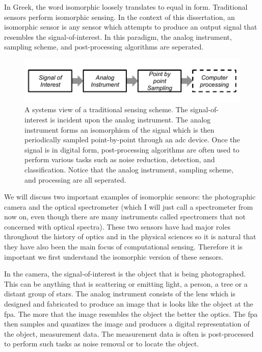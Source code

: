 In Greek, the word isomorphic loosely translates to equal in form. Traditional sensors perform isomorphic sensing. In the context of this dissertation, an isomorphic sensor is any sensor which attempts to produce an output signal that resembles the signal-of-interest. In this paradigm, the analog instrument, sampling scheme, and post-processing algorithms are seperated.

\begin{figure}
    \centering
    \includegraphics[scale=1]{isomorphicsensorflowchart}
    \caption{A systems view of a traditional sensing scheme. The signal-of-interest is incident upon the analog instrument. The analog instrument forms an isomorphism of the signal which is then periodically sampled point-by-point through an \gls{adc} device. Once the signal is in digital form, post-processing algorithms are often used to perform various tasks such as noise reduction, detection, and classification. Notice that the analog instrument, sampling scheme, and processing are all seperated. }
    \label{fig:isomorphicsesingflowchart}
\end{figure}

We will discuss two important examples of isomorphic sensors: the photographic camera and the optical spectrometer (which I will just call a spectrometer from now on, even though there are many instruments called spectromers that not concerned with optical spectra). These two sensors have had major roles throughout the history of optics and in the physical sciences so it is natural that they have also been the main focus of computational sensing. Therefore it is important we first understand the isomorphic version of these sensors.

In the camera, the signal-of-interest is the object that is being photographed. This can be anything that is scattering or emitting light, a person, a tree or a distant group of stars. The analog instrument consists of the lens which is designed and fabricated to produce an image that is looks like the object at the \gls{fpa}. The more that the image resembles the object the better the optics. The \gls{fpa} then samples and quantizes the image and produces a digital representation of the object, measurement data. The measurement data is often is post-processed to perform such tasks as noise removal or to locate the object. 

